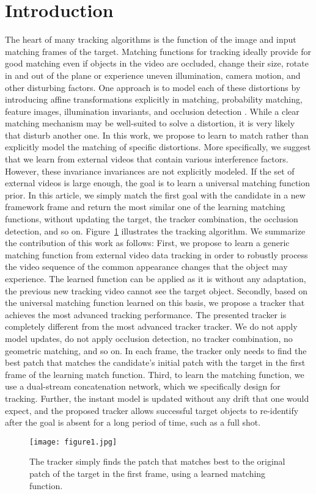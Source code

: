 \documentclass[10pt,twocolumn,letterpaper]{article}
\begin{document}
\section{Introduction}
The heart of many tracking algorithms is the function of the image and input matching frames of the target. Matching functions for tracking ideally provide for good matching even if objects in the video are occluded, change their size, rotate in and out of the plane or experience uneven illumination, camera motion, and other disturbing factors. One approach is to model each of these distortions by introducing affine transformations explicitly in matching\cite{Lucas_1981_An}, probability matching\cite{Comaniciu_2000_Real-time}, feature images, illumination invariants\cite{Nguyen_2006_Robust}, and occlusion detection\cite{Pan_2007_Robust} . While a clear matching mechanism may be well-suited to solve a distortion, it is very likely that disturb another one. In this work, we propose to learn to match rather than explicitly model the matching of specific distortions. More specifically, we suggest that we learn from external videos that contain various interference factors. However, these invariance invariances are not explicitly modeled. If the set of external videos is large enough, the goal is to learn a universal matching function prior. In this article, we simply match the first goal with the candidate in a new framework frame and return the most similar one of the learning matching functions, without updating the target, the tracker combination, the occlusion detection, and so on. Figure~\ref{pic1} illustrates the tracking algorithm. We summarize the contribution of this work as follows: First, we propose to learn a generic matching function from external video data tracking in order to robustly process the video sequence of the common appearance changes that the object may experience. The learned function can be applied as it is without any adaptation, the previous new tracking video cannot see the target object. Secondly, based on the universal matching function learned on this basis, we propose a tracker that achieves the most advanced tracking performance. The presented tracker is completely different from the most advanced tracker tracker. We do not apply model updates, do not apply occlusion detection, no tracker combination, no geometric matching, and so on. In each frame, the tracker only needs to find the best patch that matches the candidate's initial patch with the target in the first frame of the learning match function. Third, to learn the matching function, we use a dual-stream concatenation network, which we specifically design for tracking. Further, the instant model is updated without any drift that one would expect, and the proposed tracker allows successful target objects to re-identify after the goal is absent for a long period of time, such as a full shot.
\begin{figure}
	\centering
	\texttt{[image: figure1.jpg]}
	\caption{The tracker simply finds the patch that matches
		best to the original patch of the target in the first frame,
		using a learned matching function. }\label{pic1}
\end{figure}
\end{document}
